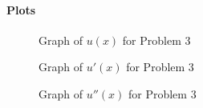 \documentclass[12pt, a4paper]{article}
\begin{document}
\paragraph{Plots}
\begin{figure}[h]
  \centering
  \caption{Graph of \(u(x)\) for Problem 3}
\end{figure}

\begin{figure}[h]
  \centering
  \caption{Graph of \(u'(x)\) for Problem 3}
\end{figure}

\begin{figure}[h]
  \centering
  \caption{Graph of \(u''(x)\) for Problem 3}
\end{figure}
\end{document}
